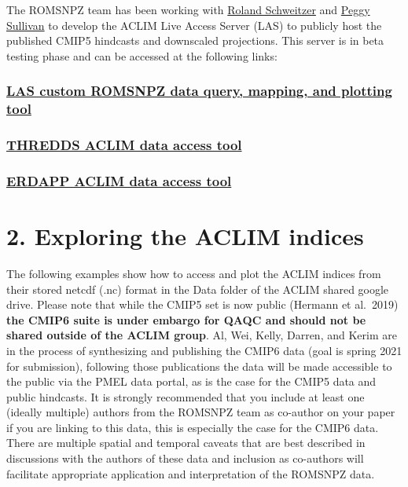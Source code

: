\documentclass[
]{article}
\begin{document}
The ROMSNPZ team has been working with
\href{roland.schweitzer@noaa.gov}{Roland Schweitzer} and
\href{peggy.sullivan@noaa.gov}{Peggy Sullivan} to develop the ACLIM Live
Access Server (LAS) to publicly host the published CMIP5 hindcasts and
downscaled projections. This server is in beta testing phase and can be
accessed at the following links:

\hypertarget{las-custom-romsnpz-data-query-mapping-and-plotting-tool}{%
\subsubsection{\texorpdfstring{\href{https://data.pmel.noaa.gov/aclim/las/}{LAS
custom ROMSNPZ data query, mapping, and plotting
tool}}{LAS custom ROMSNPZ data query, mapping, and plotting tool}}\label{las-custom-romsnpz-data-query-mapping-and-plotting-tool}}

\hypertarget{thredds-aclim-data-access-tool}{%
\subsubsection{\texorpdfstring{\href{https://data.pmel.noaa.gov/aclim/thredds/}{THREDDS
ACLIM data access
tool}}{THREDDS ACLIM data access tool}}\label{thredds-aclim-data-access-tool}}

\hypertarget{erdapp-aclim-data-access-tool}{%
\subsubsection{\texorpdfstring{\href{https://data.pmel.noaa.gov/aclim/erddap/}{ERDAPP
ACLIM data access
tool}}{ERDAPP ACLIM data access tool}}\label{erdapp-aclim-data-access-tool}}

\hypertarget{exploring-the-aclim-indices}{%
\section{2. Exploring the ACLIM
indices}\label{exploring-the-aclim-indices}}

The following examples show how to access and plot the ACLIM indices
from their stored netcdf (.nc) format in the Data folder of the ACLIM
shared google drive. Please note that while the CMIP5 set is now public
(Hermann et al.~2019) \textbf{the CMIP6 suite is under embargo for QAQC
and should not be shared outside of the ACLIM group}. Al, Wei, Kelly,
Darren, and Kerim are in the process of synthesizing and publishing the
CMIP6 data (goal is spring 2021 for submission), following those
publications the data will be made accessible to the public via the PMEL
data portal, as is the case for the CMIP5 data and public hindcasts. It
is strongly recommended that you include at least one (ideally multiple)
authors from the ROMSNPZ team as co-author on your paper if you are
linking to this data, this is especially the case for the CMIP6 data.
There are multiple spatial and temporal caveats that are best described
in discussions with the authors of these data and inclusion as
co-authors will facilitate appropriate application and interpretation of
the ROMSNPZ data.
\end{document}
